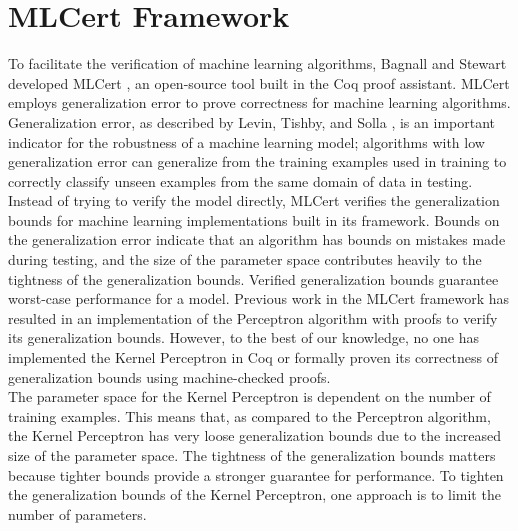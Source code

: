 \section{MLCert Framework}\label{MLCertFrameworkSection}
To facilitate the verification of machine learning algorithms, Bagnall and Stewart developed MLCert \cite{BS19}, an open-source tool built in the Coq proof assistant. MLCert employs generalization error to prove correctness for machine learning algorithms. Generalization error, as described by Levin, Tishby, and Solla \cite{LTS90}, is an important indicator for the robustness of a machine learning model; algorithms with low generalization error can generalize from the training examples used in training to correctly classify unseen examples from the same domain of data in testing. Instead of trying to verify the model directly, MLCert verifies the generalization bounds for machine learning implementations built in its framework. Bounds on the generalization error indicate that an algorithm has bounds on mistakes made during testing, and the size of the parameter space contributes heavily to the tightness of the generalization bounds. Verified generalization bounds guarantee worst-case performance for a model. Previous work in the MLCert framework \cite{BS19} has resulted in an implementation of the Perceptron algorithm with proofs to verify its generalization bounds. However, to the best of our knowledge, no one has implemented the Kernel Perceptron in Coq or formally proven its correctness of generalization bounds using machine-checked proofs.
\\The parameter space for the Kernel Perceptron is dependent on the number of training examples. This means that, as compared to the Perceptron algorithm, the Kernel Perceptron has very loose generalization bounds due to the increased size of the parameter space. The tightness of the generalization bounds matters because tighter bounds provide a stronger guarantee for performance. To tighten the generalization bounds of the Kernel Perceptron, one approach is to limit the number of parameters.
